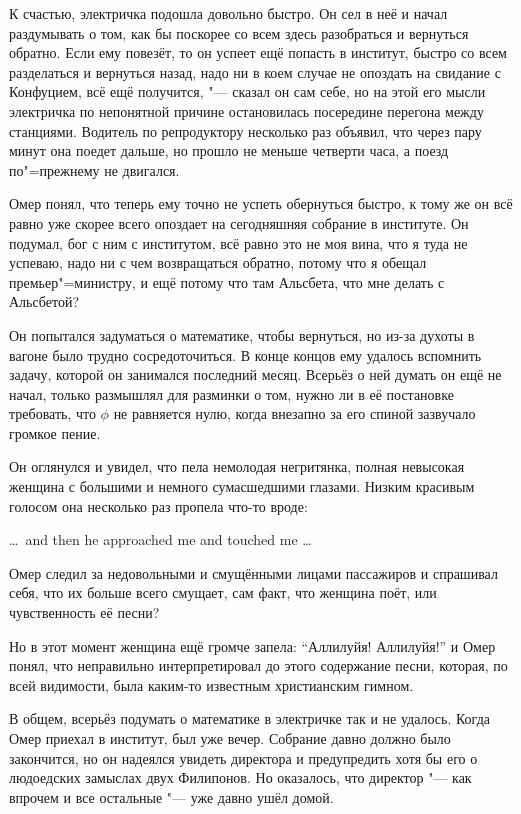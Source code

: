 К счастью, электричка подошла довольно быстро.
Он сел в неё и начал раздумывать о том, как бы поскорее со всем здесь
разобраться и вернуться обратно.
Если ему повезёт, то он успеет ещё попасть в институт, быстро со всем разделаться
и вернуться назад, надо ни в коем случае не опоздать на свидание с Конфуцием,
всё ещё получится, "--- сказал он сам себе, но на этой его мысли электричка по
непонятной причине остановилась посередине перегона между станциями.
Водитель по репродуктору несколько раз объявил, что через пару минут она поедет
дальше, но прошло не меньше четверти часа, а поезд по"=прежнему не двигался.

Омер понял, что теперь ему точно не успеть обернуться быстро, к тому же он всё
равно уже скорее всего опоздает на сегодняшняя собрание в институте.
Он подумал, бог с ним с институтом, всё равно это не моя вина, что я туда не
успеваю, надо ни с чем возвращаться обратно, потому что я обещал
премьер"=министру, и ещё потому что там Альсбета, что мне делать с Альсбетой?

Он попытался задуматься о математике, чтобы вернуться, но из-за духоты в вагоне
было трудно сосредоточиться.
В конце концов ему удалось вспомнить задачу, которой он занимался последний
месяц.
Всерьёз о ней думать он ещё не начал, только размышлял для разминки о том, нужно
ли в её постановке требовать, что $\phi$ не равняется нулю, когда внезапно за
его спиной зазвучало громкое пение.

Он оглянулся и увидел, что пела немолодая негритянка, полная невысокая женщина с
большими и немного сумасшедшими глазами.
Низким красивым голосом она несколько раз пропела что-то вроде:

\foreignlanguage{english}{\ldots\ and then he approached me and touched me \ldots}

Омер следил за недовольными и смущёнными лицами пассажиров и спрашивал себя, что
их больше всего смущает, сам факт, что женщина поёт, или чувственность её песни?

Но в этот момент женщина ещё громче запела: \enquote{Аллилуйя! Аллилуйя!} и Омер
понял, что неправильно интерпретировал до этого содержание песни, которая, по
всей видимости, была каким-то известным христианским гимном.

В общем, всерьёз подумать о математике в электричке так и не удалось.
Когда Омер приехал в институт, был уже вечер.
Собрание давно должно было закончится, но он надеялся увидеть директора и
предупредить хотя бы его о людоедских замыслах двух Филипонов.
Но оказалось, что директор "--- как впрочем и все остальные "--- уже давно ушёл
домой.

